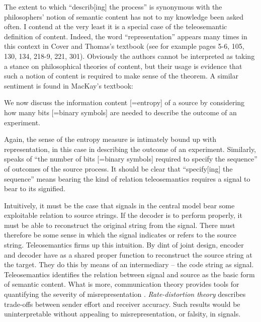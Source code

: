 \noindent The extent to which ``describ[ing] the process'' is synonymous with the philosophers' notion of semantic content has not to my knowledge been asked often.
I contend at the very least it is a special case of the teleosemantic definition of content.
Indeed, the word ``representation'' appears many times in this context in Cover and Thomas's textbook (see for example pages 5-6, 105, 130, 134, 218-9, 221, 301).
Obviously the authors cannot be interpreted as taking a stance on philosophical theories of content, but their usage is evidence that such a notion of content is required to make sense of the theorem.
A similar sentiment is found in MacKay's textbook:

\begin{myquote}
We now discuss the information content [=entropy] of a source by considering how many bits [=binary symbols] are needed to describe the outcome of an experiment.
\par\hspace*{\fill}\citet[73]{mackay2003information}
\end{myquote}

\noindent Again, the sense of the entropy measure is intimately bound up with representation, in this case in describing the outcome of an experiment.
Similarly, \citet[397]{shannon1948mathematicala} speaks of ``the number of bits [=binary symbols] required to specify the sequence'' of outcomes of the source process.
It should be clear that ``specify[ing] the sequence'' means bearing the kind of relation teleosemantics requires a signal to bear to its signified.

Intuitively, it must be the case that signals in the central model bear some exploitable relation to source strings.
If the decoder is to perform properly, it must be able to reconstruct the original string from the signal.
There must therefore be some sense in which the signal indicates or refers to the source string.
Teleosemantics firms up this intuition.
By dint of joint design, encoder and decoder have as a shared proper function to reconstruct the source string at the target.
They do this by means of an intermediary -- the code string as signal.
Teleosemantics identifies the relation between signal and source as the basic form of semantic content.
What is more, communication theory provides tools for quantifying the severity of misrepresentation \citep{martinez2020information}.
\textit{Rate-distortion theory} describes trade-offs between sender effort and receiver accuracy.
Such results would be uninterpretable without appealing to misrepresentation, or falsity, in signals.

